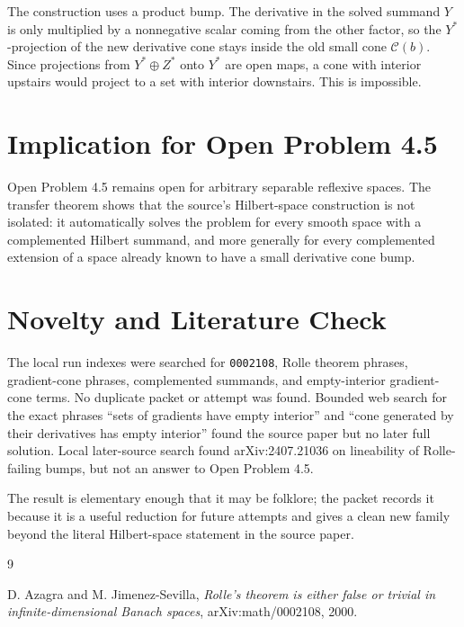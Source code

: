 \documentclass[11pt]{article}
\newcommand{\C}{\mathcal C}
\begin{document}
The construction uses a product bump.  The derivative in the solved summand
\(Y\) is only multiplied by a nonnegative scalar coming from the other factor,
so the \(Y^*\)-projection of the new derivative cone stays inside the old
small cone \(\C(b)\).  Since projections from \(Y^*\oplus Z^*\) onto \(Y^*\)
are open maps, a cone with interior upstairs would project to a set with
interior downstairs.  This is impossible.

\section*{Implication for Open Problem 4.5}

Open Problem 4.5 remains open for arbitrary separable reflexive spaces.  The
transfer theorem shows that the source's Hilbert-space construction is not
isolated: it automatically solves the problem for every smooth space with a
complemented Hilbert summand, and more generally for every complemented
extension of a space already known to have a small derivative cone bump.

\section*{Novelty and Literature Check}

The local run indexes were searched for \texttt{0002108}, Rolle theorem
phrases, gradient-cone phrases, complemented summands, and empty-interior
gradient-cone terms.  No duplicate packet or attempt was found.  Bounded web
search for the exact phrases ``sets of gradients have empty interior'' and
``cone generated by their derivatives has empty interior'' found the source
paper but no later full solution.  Local later-source search found
arXiv:2407.21036 on lineability of Rolle-failing bumps, but not an answer to
Open Problem 4.5.

The result is elementary enough that it may be folklore; the packet records it
because it is a useful reduction for future attempts and gives a clean new
family beyond the literal Hilbert-space statement in the source paper.

\begin{thebibliography}{9}

D. Azagra and M. Jimenez-Sevilla,
\emph{Rolle's theorem is either false or trivial in infinite-dimensional
Banach spaces},
arXiv:math/0002108, 2000.

\end{thebibliography}
\end{document}
